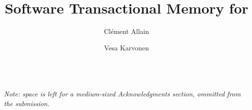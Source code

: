 \documentclass[acmsmall,screen,review,anonymous,nonacm]{acmart}
\begin{document}

\title{Software Transactional Memory for \OCamlFive}

\author{Clément Allain}

\author{Vesa Karvonen}

\begin{abstract}
  
\end{abstract}

\maketitle

















\emph{~\\
  Note: space is left for a medium-sized Acknowledgments section, ommitted from the submission.}




\end{document}

